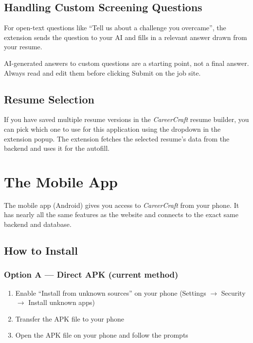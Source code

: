 \documentclass[12pt, a4paper]{report}
\newcommand{\cc}{\textit{CareerCraft}}
\begin{document}
\section{Handling Custom Screening Questions}

For open-text questions like ``Tell us about a challenge you overcame'',
the extension sends the question to your AI and fills in a relevant answer
drawn from your resume.

\begin{warningbox}
AI-generated answers to custom questions are a starting point, not a final
answer.  Always read and edit them before clicking Submit on the job site.
\end{warningbox}

\section{Resume Selection}

If you have saved multiple resume versions in the \cc{} resume builder, you can
pick which one to use for this application using the dropdown in the extension
popup.  The extension fetches the selected resume's data from the backend and
uses it for the autofill.

\chapter{The Mobile App}

The mobile app (Android) gives you access to \cc{} from your phone.  It has
nearly all the same features as the website and connects to the exact same
backend and database.

\section{How to Install}

\subsection{Option A --- Direct APK (current method)}
\begin{enumerate}
  \item Enable ``Install from unknown sources'' on your phone
        (Settings $\to$ Security $\to$ Install unknown apps)
  \item Transfer the APK file to your phone
  \item Open the APK file on your phone and follow the prompts
\end{enumerate}
\end{document}
